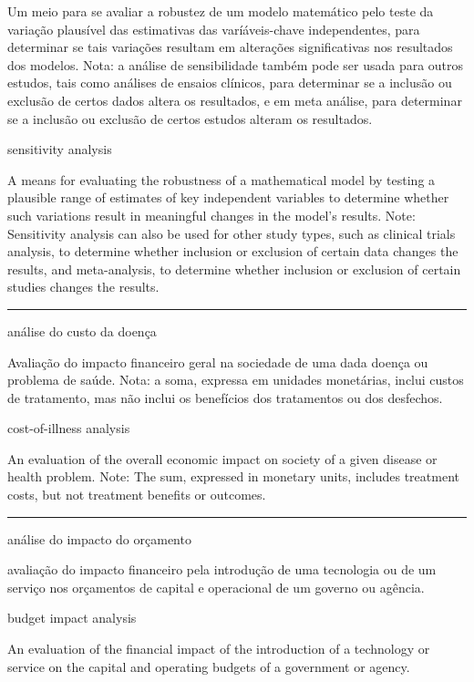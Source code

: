 \documentclass[
]{book}
\begin{document}
Um meio para se avaliar a robustez de um modelo matemático pelo teste da variação plausível das estimativas das varíáveis-chave independentes, para determinar se tais variações resultam em alterações significativas nos resultados dos modelos. Nota: a análise de sensibilidade também pode ser usada para outros estudos, tais como análises de ensaios clínicos, para determinar se a inclusão ou exclusão de certos dados altera os resultados, e em meta análise, para determinar se a inclusão ou exclusão de certos estudos alteram os resultados.

sensitivity analysis

A means for evaluating the robustness of a mathematical model by testing a plausible range of estimates of key independent variables to determine whether such variations result in meaningful changes in the model's results. Note: Sensitivity analysis can also be used for other study types, such as clinical trials analysis, to determine whether inclusion or exclusion of certain data changes the results, and meta-analysis, to determine whether inclusion or exclusion of certain studies changes the results.

\begin{center}\rule{0.5\linewidth}{0.5pt}\end{center}

análise do custo da doença

Avaliação do impacto financeiro geral na sociedade de uma dada doença ou problema de saúde. Nota: a soma, expressa em unidades monetárias, inclui custos de tratamento, mas não inclui os benefícios dos tratamentos ou dos desfechos.

cost-of-illness analysis

An evaluation of the overall economic impact on society of a given disease or health problem. Note: The sum, expressed in monetary units, includes treatment costs, but not treatment benefits or outcomes.

\begin{center}\rule{0.5\linewidth}{0.5pt}\end{center}

análise do impacto do orçamento

avaliação do impacto financeiro pela introdução de uma tecnologia ou de um serviço nos orçamentos de capital e operacional de um governo ou agência.

budget impact analysis

An evaluation of the financial impact of the introduction of a technology or service on the capital and operating budgets of a government or agency.
\end{document}
